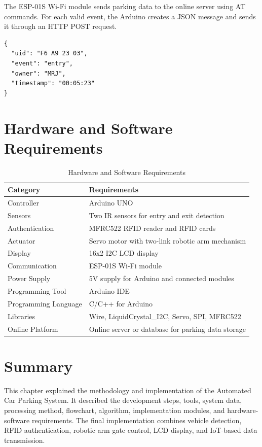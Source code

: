 The ESP-01S Wi-Fi module sends parking data to the online server using AT commands. For each valid event, the Arduino creates a JSON message and sends it through an HTTP POST request.

\begin{lstlisting}
{
  "uid": "F6 A9 23 03",
  "event": "entry",
  "owner": "MRJ",
  "timestamp": "00:05:23"
}
\end{lstlisting}

\section{Hardware and Software Requirements}

\begin{table}[H]
\centering
\small
\caption{Hardware and Software Requirements}
\label{tab:hardware_software_req}
\begin{tabular}{p{4cm} p{8.5cm}}
\toprule
\textbf{Category} & \textbf{Requirements} \\
\midrule
Controller & Arduino UNO \\
Sensors & Two IR sensors for entry and exit detection \\
Authentication & MFRC522 RFID reader and RFID cards \\
Actuator & Servo motor with two-link robotic arm mechanism \\
Display & 16x2 I2C LCD display \\
Communication & ESP-01S Wi-Fi module \\
Power Supply & 5V supply for Arduino and connected modules \\
Programming Tool & Arduino IDE \\
Programming Language & C/C++ for Arduino \\
Libraries & Wire, LiquidCrystal\_I2C, Servo, SPI, MFRC522 \\
Online Platform & Online server or database for parking data storage \\
\bottomrule
\end{tabular}
\normalsize
\end{table}

\section{Summary}

This chapter explained the methodology and implementation of the Automated Car Parking System. It described the development steps, tools, system data, processing method, flowchart, algorithm, implementation modules, and hardware-software requirements. The final implementation combines vehicle detection, RFID authentication, robotic arm gate control, LCD display, and IoT-based data transmission.

